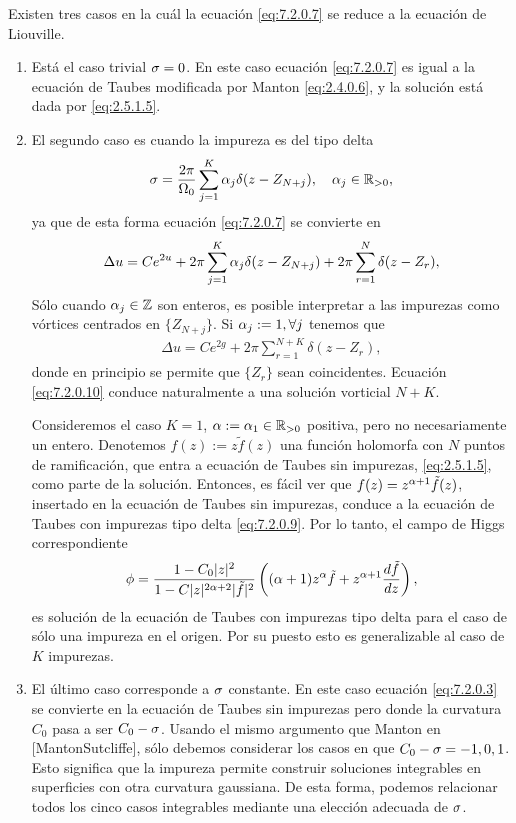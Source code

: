 Existen tres casos en la cuál la ecuación \eqref{eq:7.2.0.7} se reduce a la ecuación de Liouville.

\begin{enumerate}
	\item Está el caso trivial $\sigma =0$. En este caso ecuación \eqref{eq:7.2.0.7} es igual a la ecuación de Taubes modificada por Manton \eqref{eq:2.4.0.6}, y la solución está dada por \eqref{eq:2.5.1.5}.

	\item El segundo caso es cuando la impureza es del tipo delta
	      \begin{align}
		      \sg = \f{2\pi}{\Om_0}\sum_{j=1}^K\al_j\delta(z-Z_{N+j}), \ \ \ \al_j\in\m R_{>0},
	      \end{align}
	      ya que de esta forma ecuación \eqref{eq:7.2.0.7} se convierte en
	      \begin{align}
		      \Delta u = Ce^{2u}+2\pi\sum_{j=1}^K\alpha_j\delta(z-Z_{N+j})+2\pi\sum_{r=1}^N\delta(z-Z_r), \label{eq:7.2.0.9}
	      \end{align}
	      Sólo cuando $\alpha_j\in\mathbb{Z}$ son enteros, es posible interpretar a las impurezas como vórtices centrados en  $\{Z_{N+j}\}$. Si $\alpha_j:=1,\forall j$ tenemos que
	      \begin{align}
		      \Delta u = Ce^{2g}+2\pi\sum_{r=1}^{N+K}\delta(z-Z_r), \label{eq:7.2.0.10}
	      \end{align}
	      donde en principio se permite que $\{Z_r\}$ sean coincidentes. Ecuación \eqref{eq:7.2.0.10} conduce naturalmente a una solución vorticial $N+K$.

	      Consideremos el caso $K=1$, $\alpha:=\alpha_1\in\mathbb{R}_{>0}$ positiva, pero no necesariamente un entero. Denotemos $f(z):=z\tilde f(z)$ una función holomorfa con $N$ puntos de ramificación, que entra a ecuación de Taubes sin impurezas, \eqref{eq:2.5.1.5}, como parte de la solución. Entonces, es fácil ver que $f(z)=z^{\alpha+1}\tilde f(z)$, insertado en la ecuación de Taubes sin impurezas, conduce a la ecuación de Taubes con impurezas tipo delta \eqref{eq:7.2.0.9}. Por lo tanto, el campo de Higgs correspondiente
	      \begin{align}
		      \phi = \frac{1-C_0|z|^2}{1-C|z|^{2\alpha+2}|\tilde f|^2}\left((\alpha+1)z^\alpha\tilde f+z^{\alpha+1}\frac{d\tilde f}{dz}\right),
	      \end{align}
	      es solución de la ecuación de Taubes con impurezas tipo delta para el caso de sólo una impureza en el origen. Por su puesto esto es generalizable al caso de $K$ impurezas.

	\item El último caso corresponde a $\sigma$ constante. En este caso ecuación \eqref{eq:7.2.0.3} se convierte en la ecuación de Taubes sin impurezas pero donde la curvatura $C_0$ pasa a ser $C_0-\sigma$. Usando el mismo argumento que Manton en [MantonSutcliffe], sólo debemos considerar los casos en que $C_0-\sigma=-1,0,1$. Esto significa que la impureza permite construir soluciones integrables en superficies con otra curvatura gaussiana. De esta forma, podemos relacionar todos los cinco casos integrables mediante una elección adecuada de $\sigma$.

\end{enumerate}



